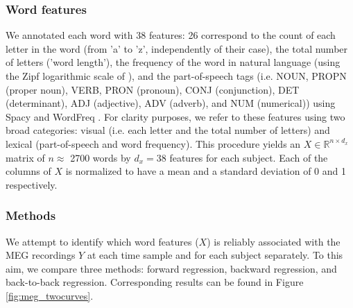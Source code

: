 \subsubsection{Word features} We annotated each word with 38 features: 26
correspond to the count of each letter in the word (from 'a' to 'z',
independently of their case), the total number of letters ('word length'), the
frequency of the word in natural language (using the Zipf logarithmic scale
of \citep{van2014subtlex}), and the part-of-speech tags (i.e. NOUN, PROPN (proper
noun), VERB, PRON (pronoun), CONJ (conjunction), DET (determinant), ADJ
(adjective), ADV (adverb), and NUM (numerical)) using Spacy \citep{spacy2} and
WordFreq \citep{speerwordfreq}. For clarity purposes, we refer to these
features using two broad categories: visual (i.e. each letter and the total
number of letters) and lexical (part-of-speech and word frequency). This
procedure yields an $X \in \mathbb{R}^{n \times d_x}$ matrix of $n\approx$ 2700 words by
$d_x=38$ features for each subject. Each of the columns of $X$ is normalized to
have a mean and a standard deviation of 0 and 1 respectively.

\subsubsection{Methods}

We attempt to identify which word features ($X$) is reliably associated with the MEG recordings $Y$ at each time sample and for each subject separately. To this aim,
we compare three methods: forward regression, backward regression, and back-to-back regression.
Corresponding results can be found in Figure \ref{fig:meg_twocurves}.

